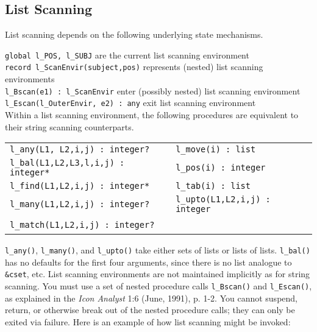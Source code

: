 \subsection*{List Scanning}

List scanning depends on the following underlying state mechanisms.

\texttt{global l\_POS, l\_SUBJ} are the current list scanning
environment\\
\texttt{record l\_ScanEnvir(subject,pos)} represents (nested) list
scanning environments\\
\texttt{l\_Bscan(e1) : l\_ScanEnvir} enter (possibly nested) list
scanning environment\\
\texttt{l\_Escan(l\_OuterEnvir, e2) : any} exit list scanning environment \\

\noindent Within a list scanning environment, the following procedures
are equivalent to their string scanning counterparts.

\begin{tabular}{m{3in}m{3in}}
\texttt{l\_any(L1, L2,i,j) : integer?} & \texttt{l\_move(i) : list}\\
\texttt{l\_bal(L1,L2,L3,l,i,j) : integer*} & \texttt{l\_pos(i) : integer}\\
\texttt{l\_find(L1,L2,i,j) : integer*} & \texttt{l\_tab(i) : list}\\
\texttt{l\_many(L1,L2,i,j) : integer?} &  \texttt{l\_upto(L1,L2,i,j) : integer}\\
\texttt{l\_match(L1,L2,i,j) : integer?} & \ \\
\end{tabular}

\noindent \texttt{l\_any()}, \texttt{l\_many()}, and \texttt{l\_upto()} take
either sets of lists or lists of lists. \texttt{l\_bal()} has no
defaults for the first four arguments, since there is no list
analogue to \texttt{\&cset}, etc. List scanning environments are not
maintained implicitly as for string scanning. You must use a set of
nested procedure calls \texttt{l\_Bscan()} and \texttt{l\_Escan()}, as
explained in the \textit{Icon Analyst} 1:6 (June, 1991), p. 1-2.
You cannot suspend, return, or otherwise break out of the
nested procedure calls; they can only be exited via failure. Here is an
example of how list scanning might be invoked:


